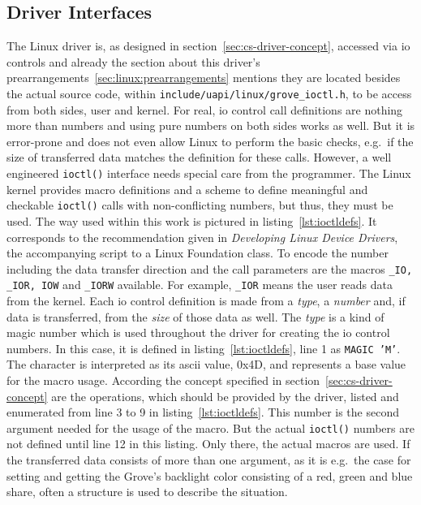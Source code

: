 \subsection{Driver Interfaces}
The Linux driver is, as designed in section~\ref{sec:cs-driver-concept}, accessed via \ac{io} controls and already the section about this driver's prearrangements~\ref{sec:linux:prearrangements} mentions they are located besides the actual source code, within \texttt{include/uapi/linux/grove\_ioctl.h}, to be access from both sides, user and kernel.
For real, \ac{io} control call definitions are nothing more than numbers and using pure numbers on both sides works as well.
But it is error-prone and does not even allow Linux to perform the basic checks, e.g.\ if the size of transferred data matches the definition for these calls.
However, a well engineered \texttt{ioctl()} interface needs special care from the programmer.
The Linux kernel provides macro definitions and a scheme to define meaningful and checkable \texttt{ioctl()} calls with non-conflicting numbers, but thus, they must be used.
The way used within this work is pictured in listing~\ref{lst:ioctldefs}.
It corresponds to the recommendation given in \textit{Developing Linux Device Drivers}\cite{lfd430}, the accompanying script to a Linux Foundation class.
To encode the number including the data transfer direction and the call parameters are the macros \texttt{_IO, _IOR, IOW} and \texttt{_IORW} available.
For example, \texttt{_IOR} means the user reads data from the kernel.
Each \ac{io} control definition is made from a \textit{type}, a \textit{number} and, if data is transferred, from the \textit{size} of those data as well. 
The \textit{type} is a kind of magic number which is used throughout the driver for creating the \ac{io} control numbers.
In this case, it is defined in listing~\ref{lst:ioctldefs}, line 1 as \texttt{MAGIC 'M'}.
The character is interpreted as its \ac{ascii} value, 0x4D, and represents a base value for the macro usage.
According the concept specified in section~\ref{sec:cs-driver-concept} are the operations, which should be provided by the driver, listed and enumerated from line 3 to 9 in listing~\ref{lst:ioctldefs}.
This number is the second argument needed for the usage of the macro.
But the actual \texttt{ioctl()} numbers are not defined until line 12 in this listing.
Only there, the actual macros are used.
If the transferred data consists of more than one argument, as it is e.g.\ the case for setting and getting the Grove's backlight color consisting of a red, green and blue share, often a structure is used to describe the situation.
